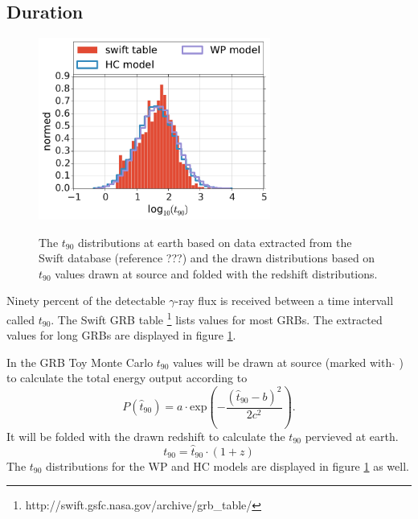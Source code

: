 \subsection{Duration}
\begin{figure}[ht]
\centering
 \captionsetup{width=.68\textwidth}
{\includegraphics[width=0.68\textwidth]{fig/t90earth.pdf}}
    \caption{The $t_{90}$ distributions at earth based on data extracted from
the Swift database (reference ???) and the drawn distributions based on
$t_{90}$ values drawn at source and folded with the redshift distributions.}
\label{fig:t90earth}
\end{figure}
Ninety percent of the detectable $\gamma$-ray flux is received between a
time intervall called $t_{90}$. The Swift GRB table
\footnote{http://swift.gsfc.nasa.gov/archive/grb\_table/} lists 
values for most GRBs.
The extracted values for long GRBs are displayed in figure \ref{fig:t90earth}. 

In the GRB Toy Monte Carlo $t_{90}$ values will be drawn at source (marked with
$\hat{}$ ) to
calculate the total energy output according to
\begin{equation}
 P\left(\hat{t}_{90}\right) = a \cdot \text{exp} \left( -
\frac{\left(\hat{t}_{90} -
b \right)^2}{2 c^2} \right).
\label{eq:t90dist}
\end{equation}
It will be folded with the drawn
redshift to calculate the $t_{90}$ pervieved at earth.
\begin{equation}
 t_{90} = \hat{t}_{90} \cdot \left( 1 + z \right)
\label{eq:t90earth}
\end{equation}
The $t_{90}$ distributions for the WP and HC models are displayed in figure
\ref{fig:t90earth} as well.



